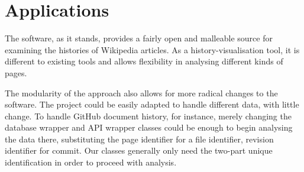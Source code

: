 \section{Applications}
The software, as it stands, provides a fairly open and malleable
source for examining the histories of Wikipedia articles. As a
history-visualisation tool, it is different to existing tools and
allows flexibility in analysing different kinds of pages.

The modularity of the approach also allows for more radical changes to
the software. The project could be easily adapted to handle different
data, with little change. To handle GitHub document history, for
instance, merely changing the database wrapper and API wrapper classes
could be enough to begin analysing the data there, substituting the
page identifier for a file identifier, revision identifier for
commit. Our classes generally only need the two-part unique
identification in order to proceed with analysis.
